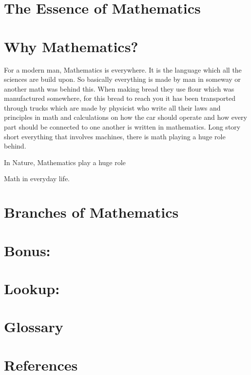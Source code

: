 \section{The Essence of Mathematics}
\section{Why Mathematics?}
For a modern man, Mathematics is everywhere. It is the language which all the sciences are build upon. So basically everything is made by man in someway or another math was behind this. When making bread they use flour which was manufactured somewhere, for this bread to reach you it has been transported through trucks which are made by physicist who write all their laws and principles in math and calculations on how the car should operate and how every part should be connected to one another is written in mathematics. Long story short everything that involves machines, there is math playing a huge role behind.

In Nature, Mathematics play a huge role

Math in everyday life.



\section{Branches of Mathematics}

\section{Bonus: }%
\section{Lookup: }%
\section{Glossary}
\section{References}

\newpage